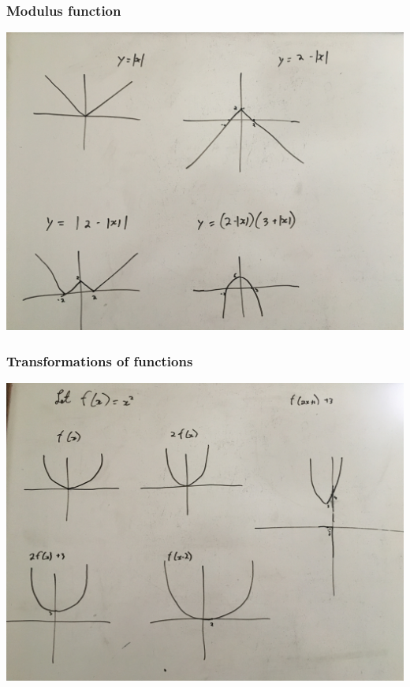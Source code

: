 \documentclass{article}
\begin{document}
\subsubsection{Modulus function}
\includegraphics[scale = 0.1]{media/Modulus_graphs}

\subsubsection{Transformations of functions}
\includegraphics[scale=0.1]{media/Quadratic_graphs}
\end{document}
